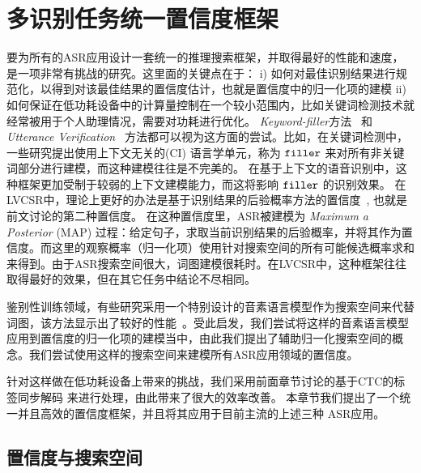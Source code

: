 
\section{多识别任务统一置信度框架}
\label{chap:unify}

要为所有的ASR应用设计一套统一的推理搜索框架，并取得最好的性能和速度，是一项非常有挑战的研究。这里面的关键点在于： i) 如何对最佳识别结果进行规范化，以得到对该最佳结果的置信度估计，也就是置信度中的归一化项的建模
    ii) 如何保证在低功耗设备中的计算量控制在一个较小范围内，比如关键词检测技术就经常被用于个人助理情况，需要对功耗进行优化。
    {\em Keyword-filler}方法~\cite{young1994detecting} 和 {\em Utterance Verification}~\cite{rose1995training} 方法都可以视为这方面的尝试。比如，在关键词检测中，一些研究提出使用上下文无关的(CI) 语言学单元，称为 $\tt filler$ 来对所有非关键词部分进行建模，而这种建模往往是不完美的。
    在基于上下文的语音识别中，这种框架更加受制于较弱的上下文建模能力，而这将影响 $\tt filler$ 的识别效果。
    在LVCSR中，理论上更好的办法是基于识别结果的后验概率方法的置信度~\cite{wessel2001confidence}, 也就是前文讨论的第二种置信度。 在这种置信度里，ASR被建模为  {\em Maximum a Posterior} (MAP) 过程：给定句子，求取当前识别结果的后验概率，并将其作为置信度。而这里的观察概率（归一化项）使用针对搜索空间的所有可能候选概率求和来得到。由于ASR搜索空间很大，词图建模很耗时。在LVCSR中，这种框架往往取得最好的效果，但在其它任务中结论不尽相同。

    鉴别性训练领域，有些研究采用一个特别设计的音素语言模型作为搜索空间来代替词图，该方法显示出了较好的性能~\cite{chen2006advances}\cite{povey2016purely}。受此启发，我们尝试将这样的音素语言模型应用到置信度的归一化项的建模当中，由此我们提出了辅助归一化搜索空间的概念。我们尝试使用这样的搜索空间来建模所有ASR应用领域的置信度。 %
    
    针对这样做在低功耗设备上带来的挑战，我们采用前面章节讨论的基于CTC的标签同步解码\cite{Chen+2016} 来进行处理，由此带来了很大的效率改善。
    本章节我们提出了一个统一并且高效的置信度框架，并且将其应用于目前主流的上述三种 ASR应用。



  \subsection{置信度与搜索空间}
  \label{Sec:conf-search-space}

